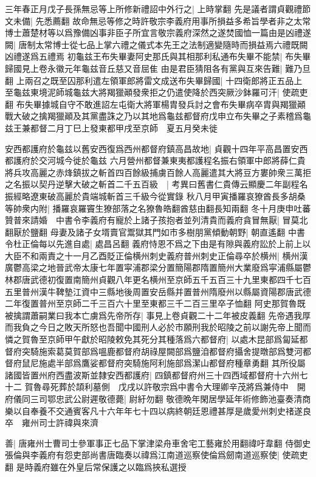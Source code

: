 三年春正月戊子長孫無忌等上所修新禮詔中外行之|{
	上時掌翻}
先是議者謂貞觀禮節文未備|{
	先悉薦翻}
故命無忌等修之時許敬宗李義府用事所損益多希旨學者非之太常博士蕭楚材等以爲豫備凶事非臣子所宜言敬宗義府深然之遂焚國恤一篇由是凶禮遂闕|{
	唐制太常博士從七品上掌六禮之儀式本先王之法制適變隨時而損益焉六禮既闕凶禮遂爲五禮焉}
初龜兹王布失畢妻阿史那氏與其相那利私通布失畢不能禁|{
	布失畢歸國見上卷永徽元年龜兹音丘慈又音屈隹}
由是君臣猜阻各有黨與互來告難|{
	難乃旦翻}
上兩召之既至囚那利遣左領軍郎將雷文成送布失畢歸國|{
	十四衛郎將正五品上}
至龜兹東境泥師城龜兹大將羯獵顚發衆拒之仍遣使降於西突厥沙鉢羅可汗|{
	使疏吏翻}
布失畢據城自守不敢進詔左屯衛大將軍楊胄發兵討之會布失畢病卒胄與羯獵顚戰大破之擒羯獵顚及其黨盡誅之乃以其地爲龜兹都督府戊申立布失畢之子素稽爲龜兹王兼都督二月丁巳上發東都甲戌至京師　夏五月癸未徙

安西都護府於龜兹以舊安西復爲西州都督府鎮高昌故地|{
	貞觀十四年平高昌置安西都護府於交河城今徙於龜兹}
六月營州都督兼東夷都護程名振右領軍中郎將薛仁貴將兵攻高麗之赤烽鎮拔之斬首四百餘級捕虜百餘人高麗遣其大將豆方婁帥衆三萬拒之名振以契丹逆擊大破之斬首二千五百級　|{
	考異曰舊書仁貴傳云顯慶二年副程名振經略遼東破高麗於貴端城斬首三千級今從實錄}
秋八月甲寅播羅哀獠酋長多胡桑等帥衆内附|{
	播羅哀羅竇生獠部落之名獠魯皓翻酋慈由翻長知兩翻}
冬十月庚申吐蕃贊普來請婚　中書令李義府有寵於上諸子孩抱者並列清貴而義府貪冒無厭|{
	冒莫北翻厭於鹽翻}
母妻及諸子女壻賣官鬻獄其門如市多樹朋黨傾動朝野|{
	朝直遙翻}
中書令杜正倫每以先進自處|{
	處昌呂翻}
義府恃恩不爲之下由是有隙與義府訟於上前上以大臣不和兩責之十一月乙酉貶正倫横州刺史義府普州刺史正倫尋卒於横州|{
	横州漢廣鬱高梁之地晉武帝太康七年置寜浦郡梁分置簡陽郡隋置簡州大業廢爲寜浦縣屬鬱林郡唐武德初復置南簡州貞觀八年更名横州至京師五千五百三十九里東都四千七百五里普州漢牛鞞墊江資中三縣地後周置安岳縣并置普州隋廢州以縣屬資陽郡唐武德二年復置普州至京師二千三百六十里至東都三千二百三里卒子恤翻}
阿史那賀魯既被擒謂蕭嗣業曰我本亡虜爲先帝所存|{
	事見上卷貞觀二十二年被皮義翻}
先帝遇我厚而我負之今日之敗天所怒也吾聞中國刑人必於市願刑我於昭陵之前以謝先帝上聞而憐之賀魯至京師甲午獻於昭陵敕免其死分其種落爲六都督府|{
	以處木昆部爲匐延都督府突騎施索葛莫賀部爲嗢鹿都督府胡祿屋闕部爲鹽洎都督府攝舍提暾部爲雙河都督府鼠尼施處半部爲鷹娑都督府突騎施阿利施部爲潔山都督府種章勇翻}
其所役屬諸國皆置州府西盡波斯並隸安西都護府|{
	四鎮都督府州三十四西域都督府十六州七十二}
賀魯尋死葬於頡利墓側　戊戌以許敬宗爲中書令大理卿辛茂將爲兼侍中　開府儀同三司鄂忠武公尉遲敬德薨|{
	尉紆勿翻}
敬德晩年閑居學延年術修飾池臺奏清商樂以自奉養不交通賓客凡十六年年七十四以病終朝廷恩禮甚厚是歲愛州刺史禇遂良卒　雍州司士許禕與來濟

善|{
	唐雍州士曹司士參軍事正七品下掌津梁舟車舍宅工藝雍於用翻禕吁韋翻}
侍御史張倫與李義府有怨吏部尚書唐臨奏以禕爲江南道巡察使倫爲劒南道巡察使|{
	使疏吏翻}
是時義府雖在外皇后常保護之以臨爲挾私選授

